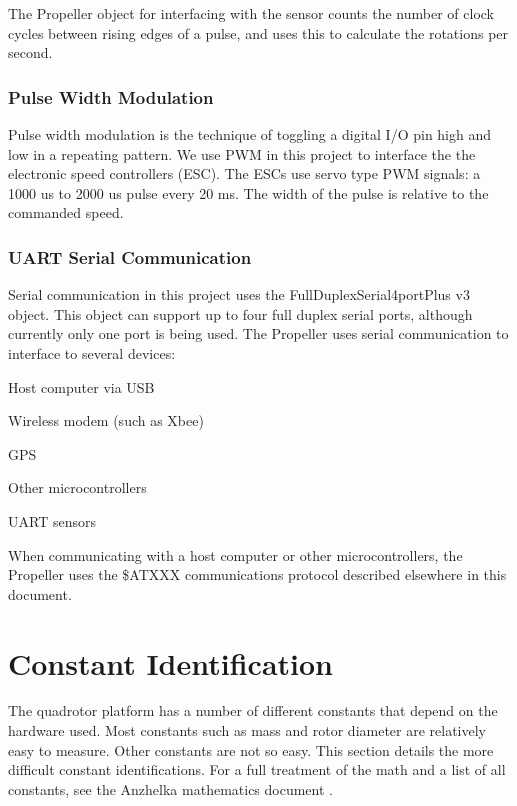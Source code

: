 \documentclass{article}
\numberwithin{equation}{section} %
\begin{document}
The Propeller object for interfacing with the sensor counts the number of clock cycles between rising edges of a pulse, and uses this to calculate the rotations per second.

\subsubsection{Pulse Width Modulation}
Pulse width modulation is the technique of toggling a digital I/O pin high and low in a repeating pattern. We use PWM in this project to interface the the electronic speed controllers (ESC). The ESCs use servo type PWM signals: a 1000 us to 2000 us pulse every 20 ms. The width of the pulse is relative  to the commanded speed. 


\subsubsection{UART Serial Communication}
Serial communication in this project uses the FullDuplexSerial4portPlus v3 object. This object can support up to four full duplex serial ports, although currently only one port is being used. The Propeller uses serial communication to interface to several devices:
\begin{list}{*}{}
	\item Host computer via USB
	\item Wireless modem (such as Xbee)
	\item GPS
	\item Other microcontrollers
	\item UART sensors
\end{list}
When communicating with a host computer or other microcontrollers, the Propeller uses the \$ATXXX communications protocol described elsewhere in this document.


\section{Constant Identification}
The quadrotor platform has a number of different constants that depend on the hardware used. Most constants such as mass and rotor diameter are relatively easy to measure. Other constants are not so easy. This section details the more difficult constant identifications. For a full treatment of the math and a list of all constants, see the Anzhelka mathematics document \cite{anzhelka_math}.
\end{document}
